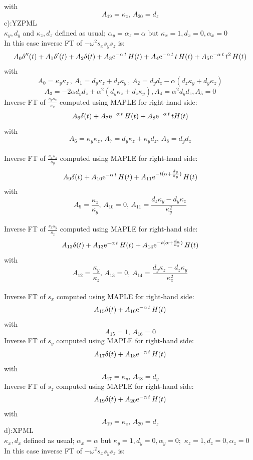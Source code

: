 \documentclass[onecolumn,extra]{gji_modified_cours_UPPA}
\begin{document}
with
$$A_{19}= \kappa_z, \, A_{20}=d_z $$
c):YZPML\\
$\kappa_y,d_y$ and $\kappa_z,d_z$ defined as usual; $\alpha_y=\alpha_z=\alpha$ but $\kappa_x = 1 ,d_x= 0,\alpha_x= 0$\\
In this case inverse FT of $-\omega^2 s_x s_y s_z$ is:
$$A_0 \delta''(t) + A_1 \delta'(t) + A_2 \delta(t)
+ A_3 {\rm e}^{-\alpha\,t} \, H(t)
+ A_4 {\rm e}^{-\alpha\,t} \,t\, H(t)
+ A_5 {\rm e}^{-\alpha\,t} \,t^{2} \,H(t)$$
with
$$A_0 = \kappa_y \kappa_z \, , \, A_1 =d_y \kappa_z + d_z \kappa_y \, , \,A_2 = d_y d_z -\alpha(d_z \kappa_y + d_y \kappa_z)$$
$$A_3= - 2 \alpha d_y d_z +\alpha ^2 (d_y \kappa_z +  d_z \kappa_y),A_4= \alpha ^2 d_y d_z, A_5=0 $$
\noindent
Inverse FT of $\frac{s_y s_z}{s_x}$ computed using MAPLE for right-hand side:\\
$$A_6\delta(t) + A_7 {\rm e}^{-\alpha\,t} \, H(t) + A_8 {\rm e}^{-\alpha\,t} \, tH(t) $$
with
$$A_6=\kappa_y \kappa_z,\,A_7=d_y \kappa_z+\kappa_y d_z,\,A_8=d_y d_z $$\\
\noindent
Inverse FT of $\frac{s_x s_z}{s_y}$ computed using MAPLE for right-hand side:\\
$$A_9\delta(t) + A_{10} {\rm e}^{-\alpha\,t} \, H(t) + A_{11} {\rm e}^{-t(\alpha+\frac{d_y}{\kappa_y})} \, H(t) $$
with
$$A_9=\frac{\kappa_z}{\kappa_y},\,A_{10}=0,
\,A_{11}=\frac{d_z \kappa_y-d_y \kappa_z }{\kappa^2_y}$$\\
\noindent
Inverse FT of $\frac{s_x s_y}{s_z}$ computed using MAPLE for right-hand side:\\
$$A_{12}\delta(t) + A_{13} {\rm e}^{-\alpha\,t} \, H(t) + A_{14} {\rm e}^{-t(\alpha+\frac{d_z}{\kappa_z})} \, H(t) $$
with
$$A_{12}=\frac{\kappa_y}{\kappa_z},\,A_{13}=0,
\,A_{14}=\frac{d_y \kappa_z-d_z \kappa_y }{\kappa^2_z}$$\\
\noindent
Inverse FT of $s_x$ computed using MAPLE for right-hand side:
$$A_{15}\delta(t) + A_{16} {\rm e}^{-\alpha \,t} \, H(t) $$
with
$$A_{15}= 1, \, A_{16}=0 $$
\noindent
Inverse FT of $s_y$ computed using MAPLE for right-hand side:
$$A_{17}\delta(t) + A_{18} {\rm e}^{-\alpha \,t} \, H(t) $$
with
$$A_{17}= \kappa_y, \, A_{18}=d_y $$
\noindent
Inverse FT of $s_z$ computed using MAPLE for right-hand side:
$$A_{19}\delta(t) + A_{20} {\rm e}^{-\alpha \,t} \, H(t) $$
with
$$A_{19}= \kappa_z, \, A_{20}=d_z $$
d):XPML\\
$\kappa_x,d_x$ defined as usual; $\alpha_x=\alpha$ but $\kappa_y = 1 ,d_y= 0,\alpha_y= 0$;$\,$ $\kappa_z = 1 ,d_z= 0,\alpha_z= 0$\\
In this case inverse FT of $-\omega^2 s_x s_y s_z$ is:
\end{document}
